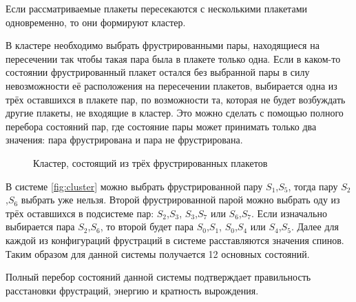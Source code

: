 \documentclass[utf8, babel, sor, jor, amsmath, amssymb, reprint]{elsarticle} %
\begin{document}
Если рассматриваемые плакеты пересекаются с несколькими плакетами одновременно, то они формируют кластер.

В кластере необходимо выбрать фрустрированными пары, находящиеся на пересечении так чтобы такая пара была в плакете только одна. Если в каком-то состоянии фрустрированный плакет остался без выбранной пары в силу невозможности её расположения на пересечении плакетов, выбирается одна из трёх оставшихся в плакете пар, по возможности та, которая не будет возбуждать другие плакеты, не входящие в кластер. Это можно сделать с помощью полного перебора состояний пар, где состояние пары может принимать только два значения: пара фрустрирована и пара не фрустрирована.

\begin{figure}[h]
	\centering
	\caption{Кластер, состоящий из трёх фрустрированных плакетов}
	\label{fig:cluster}
\end{figure}

В системе \eqref{fig:cluster}  можно выбрать фрустрированной пару $S_1$,$S_5$, тогда пару  $S_2$,$S_6$ выбрать уже нельзя. Второй фрустрированной парой можно выбрать оду из трёх оставшихся в подсистеме пар: $S_2$,$S_3$, $S_3$,$S_7$ или $S_6$,$S_7$. Если изначально выбирается пара $S_2$,$S_6$, то второй будет пара $S_0$,$S_1$, $S_0$,$S_4$ или $S_4$,$S_5$. Далее для каждой из конфигураций фрустраций в системе расставляются значения спинов. Таким образом для данной системы получается 12 основных состояний. 

Полный перебор состояний данной системы подтверждает правильность расстановки фрустраций, энергию и кратность вырождения.
\end{document}
